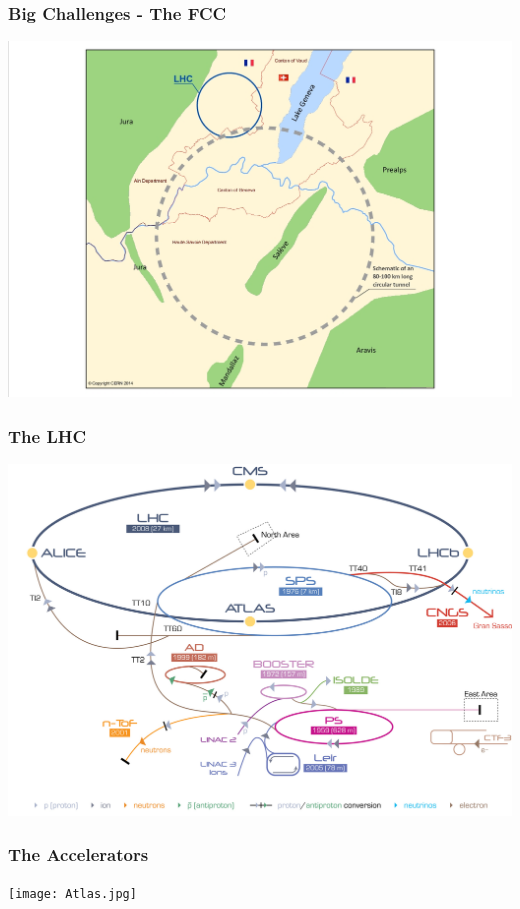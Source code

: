 \documentclass{beamer}
\begin{document}
\begin{frame}
    \frametitle{Big Challenges - The FCC}
    \includegraphics[width=1.0\textwidth,trim=4 4 4 4,clip]{CERN_LCC.jpg}
\end{frame}


\begin{frame}
    \frametitle{The LHC}
    \includegraphics[width=1.0\textwidth,trim=4 4 4 4,clip]{Cern-Accelerator-Complex2.jpg}
\end{frame}


\begin{frame}
    \frametitle{The Accelerators}
    \texttt{[image: Atlas.jpg]}
\end{frame}
\end{document}
